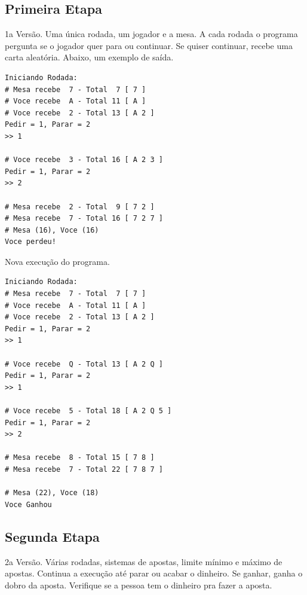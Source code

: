 \documentclass[12pt]{article}
\begin{document}
\subsection{Primeira Etapa}

1a Versão. Uma única rodada, um jogador e a mesa. A cada rodada o programa pergunta se o jogador quer para ou continuar. Se quiser continuar, recebe uma carta aleatória. Abaixo, um exemplo de saída.

\begin{verbatim}
Iniciando Rodada:
# Mesa recebe  7 - Total  7 [ 7 ]
# Voce recebe  A - Total 11 [ A ]
# Voce recebe  2 - Total 13 [ A 2 ]
Pedir = 1, Parar = 2 
>> 1

# Voce recebe  3 - Total 16 [ A 2 3 ]
Pedir = 1, Parar = 2 
>> 2

# Mesa recebe  2 - Total  9 [ 7 2 ]
# Mesa recebe  7 - Total 16 [ 7 2 7 ]
# Mesa (16), Voce (16)
Voce perdeu!
\end{verbatim}

Nova execução do programa.

\begin{verbatim}
Iniciando Rodada:
# Mesa recebe  7 - Total  7 [ 7 ]
# Voce recebe  A - Total 11 [ A ]
# Voce recebe  2 - Total 13 [ A 2 ]
Pedir = 1, Parar = 2 
>> 1

# Voce recebe  Q - Total 13 [ A 2 Q ]
Pedir = 1, Parar = 2 
>> 1

# Voce recebe  5 - Total 18 [ A 2 Q 5 ]
Pedir = 1, Parar = 2 
>> 2

# Mesa recebe  8 - Total 15 [ 7 8 ]
# Mesa recebe  7 - Total 22 [ 7 8 7 ]

# Mesa (22), Voce (18)
Voce Ganhou
\end{verbatim}

\subsection{Segunda Etapa}
2a Versão. Várias rodadas, sistemas de apostas, 
limite mínimo e máximo de apostas. Continua a 
execução até parar ou acabar o dinheiro. Se ganhar,
ganha o dobro da aposta. Verifique se a pessoa
tem o dinheiro pra fazer a aposta.
\end{document}
